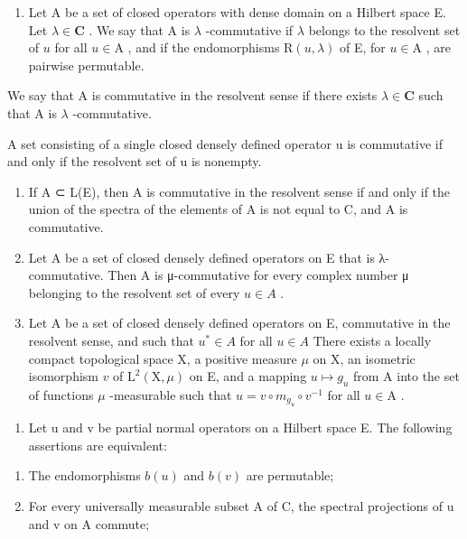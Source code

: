 \begin{enumerate}
\def\labelenumi{\arabic{enumi})}
\setcounter{enumi}{6}
\tightlist
\item
  Let A be a set of closed operators with dense domain on a Hilbert space E. Let \(\lambda \in \mathbf{C}\) . We say that A is \(\lambda\) -commutative if \(\lambda\) belongs to the resolvent set of \(u\) for all \(u \in \mathrm{A}\) , and if the endomorphisms \(\mathrm{R}(u, \lambda)\) of E, for \(u \in \mathrm{A}\) , are pairwise permutable.
\end{enumerate}

We say that A is commutative in the resolvent sense if there exists \(\lambda \in \mathbf{C}\) such that A is \(\lambda\) -commutative.

A set consisting of a single closed densely defined operator u is commutative if and only if the resolvent set of u is nonempty.

\begin{enumerate}
\def\labelenumi{\alph{enumi})}
\item
  If A ⊂ L(E), then A is commutative in the resolvent sense if and only if the union of the spectra of the elements of A is not equal to C, and A is commutative.
\item
  Let A be a set of closed densely defined operators on E that is λ-commutative. Then A is μ-commutative for every complex number μ belonging to the resolvent set of every \(u \in A\) .
\item
  Let A be a set of closed densely defined operators on E, commutative in the resolvent sense, and such that \(u^{*} \in A\) for all \(u \in A\) There exists a locally compact topological space X, a positive measure \(\mu\) on X, an isometric isomorphism \(v\) of \(\mathrm{L}^2 (\mathrm{X},\mu)\) on E, and a mapping \(u\mapsto g_u\) from A into the set of functions \(\mu\) -measurable such that \(u = v\circ m_{g_u}\circ v^{-1}\) for all \(u\in \mathrm{A}\) .
\end{enumerate}

\begin{enumerate}
\def\labelenumi{\arabic{enumi})}
\setcounter{enumi}{7}
\tightlist
\item
  Let u and v be partial normal operators on a Hilbert space E. The following assertions are equivalent:
\end{enumerate}

\begin{enumerate}
\def\labelenumi{\alph{enumi})}
\item
  The endomorphisms \(b(u)\) and \(b(v)\) are permutable;
\item
  For every universally measurable subset A of C, the spectral projections of u and v on A commute;
\end{enumerate}

